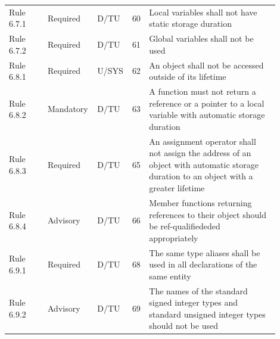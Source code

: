 \documentclass[10pt,letterpaper]{article}
\begin{document}
\begin{longtable}{p{0.14\linewidth}p{0.14\linewidth}p{0.1\linewidth}p{0.045\linewidth}p{0.475\linewidth}}
Rule 6.7.1 & Required & D/TU & 60 & Local variables shall not have static storage duration\\
Rule 6.7.2 & Required & D/TU & 61 & Global variables shall not be used\\
Rule 6.8.1 & Required & U/SYS & 62 & An object shall not be accessed outside of its lifetime\\
Rule 6.8.2 & Mandatory & D/TU & 63 & A function must not return a reference or a pointer to a local variable with automatic storage duration\\
Rule 6.8.3 & Required & D/TU & 65 & An assignment operator shall not assign the address of an object with automatic storage duration to an object with a greater lifetime\\
Rule 6.8.4 & Advisory & D/TU & 66 & Member functions returning references to their object should be ref-qualifiededed appropriately\\
Rule 6.9.1 & Required & D/TU & 68 & The same type aliases shall be used in all declarations of the same entity\\
Rule 6.9.2 & Advisory & D/TU & 69 & The names of the standard signed integer types and standard unsigned integer types should not be used\\
\bottomrule
\end{longtable}
\normalsize
\end{document}
